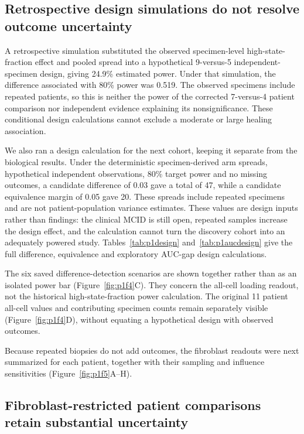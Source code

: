 


\subsection{Retrospective design simulations do not resolve outcome uncertainty}

A retrospective simulation substituted the observed specimen-level high-state-fraction effect and pooled spread into a hypothetical 9-versus-5 independent-specimen design, giving 24.9\% estimated power. Under that simulation, the difference associated with 80\% power was 0.519. The observed specimens include repeated patients, so this is neither the power of the corrected 7-versus-4 patient comparison nor independent evidence explaining its nonsignificance. These conditional design calculations cannot exclude a moderate or large healing association.

We also ran a design calculation for the next cohort, keeping it separate from the biological results. Under the deterministic specimen-derived arm spreads, hypothetical independent observations, 80\% target power and no missing outcomes, a candidate difference of 0.03 gave a total of 47, while a candidate equivalence margin of 0.05 gave 20. These spreads include repeated specimens and are not patient-population variance estimates. These values are design inputs rather than findings: the clinical MCID is still open, repeated samples increase the design effect, and the calculation cannot turn the discovery cohort into an adequately powered study. Tables~\ref{tab:p1design} and~\ref{tab:p1aucdesign} give the full difference, equivalence and exploratory AUC-gap design calculations.

The six saved difference-detection scenarios are shown together rather than as an isolated power bar (Figure~\ref{fig:p1f4}C). They concern the all-cell loading readout, not the historical high-state-fraction power calculation. The original 11 patient all-cell values and contributing specimen counts remain separately visible (Figure~\ref{fig:p1f4}D), without equating a hypothetical design with observed outcomes.

Because repeated biopsies do not add outcomes, the fibroblast readouts were next summarized for each patient, together with their sampling and influence sensitivities (Figure~\ref{fig:p1f5}A--H\label{call:p1f5}).

\subsection{Fibroblast-restricted patient comparisons retain substantial uncertainty}

